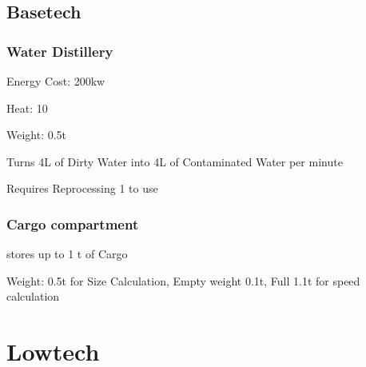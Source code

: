 \subsection{Basetech}\label{subsec:basetech}
\subsubsection{Water Distillery}\label{subsubsec:water-distillery}
Energy Cost: 200kw\par
Heat: 10\par
Weight: 0.5t\par
Turns 4L of Dirty Water into 4L of Contaminated Water per minute\par
Requires Reprocessing 1 to use\par

\subsubsection{Cargo compartment}\label{subsubsec:cargo-compartment}
stores up to 1 t of Cargo\par
Weight: 0.5t for Size Calculation, Empty weight 0.1t, Full 1.1t for speed calculation
\par
\section{Lowtech}\label{sec:lowtech}
